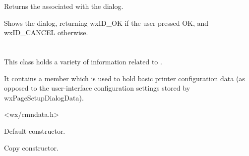 \label{wxpagesetupdialoggetpagesetupdata}


Returns the  associated with the dialog.

%
%

\label{wxpagesetupdialogshowmodal}


Shows the dialog, returning wxID\_OK if the user pressed OK, and wxID\_CANCEL
otherwise.

\section{}\label{wxpagesetupdialogdata}

This class holds a variety of information related to .

It contains a  member which is used to hold basic printer configuration data (as opposed to the
user-interface configuration settings stored by wxPageSetupDialogData).




<wx/cmndata.h>






Default constructor.


Copy constructor.


